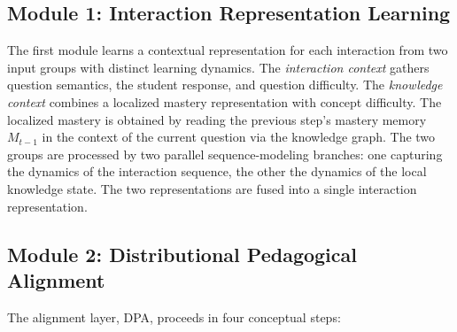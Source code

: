 \documentclass[conference]{IEEEtran}
\begin{document}
\subsection{Module 1: Interaction Representation Learning}
\label{sec:irl}

The first module learns a contextual representation for each interaction from two input groups with distinct learning dynamics. The \emph{interaction context} gathers question semantics, the student response, and question difficulty. The \emph{knowledge context} combines a localized mastery representation with concept difficulty. The localized mastery is obtained by reading the previous step's mastery memory $M_{t-1}$ in the context of the current question via the knowledge graph. The two groups are processed by two parallel sequence-modeling branches: one capturing the dynamics of the interaction sequence, the other the dynamics of the local knowledge state. The two representations are fused into a single interaction representation.

\subsection{Module 2: Distributional Pedagogical Alignment}
\label{sec:dpa}

The alignment layer, DPA, proceeds in four conceptual steps:
\end{document}
